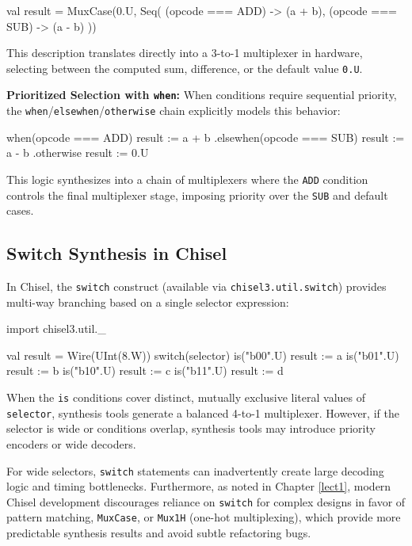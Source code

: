 \begin{chiselcode}
val result = MuxCase(0.U, Seq(
  (opcode === ADD) -> (a + b),
  (opcode === SUB) -> (a - b)
))
\end{chiselcode}

This description translates directly into a 3-to-1 multiplexer in hardware, selecting between the computed sum, difference, or the default value \texttt{0.U}.

\textbf{Prioritized Selection with \texttt{when}:}  
When conditions require sequential priority, the \texttt{when}/\texttt{elsewhen}/\texttt{otherwise} chain explicitly models this behavior:

\begin{chiselcode}
when(opcode === ADD) {
  result := a + b
}.elsewhen(opcode === SUB) {
  result := a - b
}.otherwise {
  result := 0.U
}
\end{chiselcode}

This logic synthesizes into a chain of multiplexers where the \texttt{ADD} condition controls the final multiplexer stage, imposing priority over the \texttt{SUB} and default cases.

\subsection{Switch Synthesis in Chisel}
In Chisel, the \texttt{switch} construct (available via \texttt{chisel3.util.switch}) provides multi-way branching based on a single selector expression:

\begin{chiselcode}
import chisel3.util._

val result = Wire(UInt(8.W)) 
switch(selector) { 
  is("b00".U) { result := a } 
  is("b01".U) { result := b } 
  is("b10".U) { result := c } 
  is("b11".U) { result := d } 
}
\end{chiselcode}

When the \texttt{is} conditions cover distinct, mutually exclusive literal values of \texttt{selector}, synthesis tools generate a balanced 4-to-1 multiplexer. However, if the selector is wide or conditions overlap, synthesis tools may introduce priority encoders or wide decoders. 

For wide selectors, \texttt{switch} statements can inadvertently create large decoding logic and timing bottlenecks. Furthermore, as noted in Chapter \ref{lect1}, modern Chisel development discourages reliance on \texttt{switch} for complex designs in favor of pattern matching, \texttt{MuxCase}, or \texttt{Mux1H} (one-hot multiplexing), which provide more predictable synthesis results and avoid subtle refactoring bugs.


